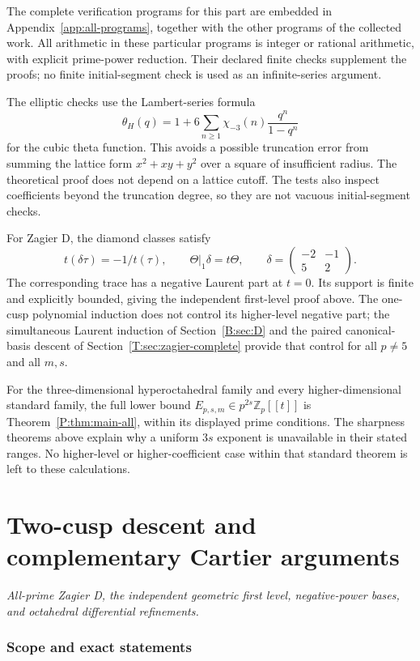 \documentclass[11pt,a4paper]{article}
\theoremstyle{definition}\newtheorem{definition}[theorem]{Definition}
\theoremstyle{remark}\newtheorem{remark}[theorem]{Remark}
\newcommand{\Zp}{\mathbb Z_p}
\numberwithin{equation}{section}
\newcommand{\partstart}[3]{\clearpage\part{#1}\label{#2}\noindent\textit{#3}\par\medskip}
\begin{document}
The complete verification programs for this part are embedded in Appendix~\ref{app:all-programs}, together with the other programs of the collected work. All arithmetic in these particular programs is integer or rational arithmetic, with explicit prime-power reduction. Their declared finite checks supplement the proofs; no finite initial-segment check is used as an infinite-series argument.

The elliptic checks use the Lambert-series formula
\[
 \theta_H(q)=1+6\sum_{n\geq1}\chi_{-3}(n)\frac{q^n}{1-q^n}
\]
for the cubic theta function.  This avoids a possible truncation error
from summing the lattice form $x^2+xy+y^2$ over a square of insufficient
radius.  The theoretical proof does not depend on a lattice cutoff.
The tests also inspect coefficients beyond the truncation degree, so
they are not vacuous initial-segment checks.

For Zagier D, the diamond classes satisfy
\[
 t(\delta\tau)=-1/t(\tau),\qquad \Theta|_1\delta=t\Theta,
 \qquad \delta=\begin{pmatrix}-2&-1\\5&2\end{pmatrix}.
\]
The corresponding trace has a negative Laurent part at $t=0$. Its support is finite and explicitly bounded, giving the independent first-level proof above. The one-cusp polynomial induction does not control its higher-level negative part; the simultaneous Laurent induction of Section~\ref{B:sec:D} and the paired canonical-basis descent of Section~\ref{T:sec:zagier-complete} provide that control for all $p\ne5$ and all $m,s$.


For the three-dimensional hyperoctahedral family and every higher-dimensional standard family, the full lower bound $E_{p,s,m}\in p^{2s}\Zp[[t]]$ is Theorem~\ref{P:thm:main-all}, within its displayed prime conditions. The sharpness theorems above explain why a uniform $3s$ exponent is unavailable in their stated ranges. No higher-level or higher-coefficient case within that standard theorem is left to these calculations.





\partstart{Two-cusp descent and complementary Cartier arguments}{part:twocusp}{All-prime Zagier D, the independent geometric first level, negative-power bases, and octahedral differential refinements.}
\section{Scope and exact statements}\label{T:source-main-1}
\end{document}
